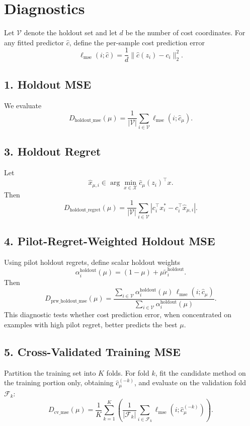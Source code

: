 \documentclass[11pt]{article}
\begin{document}
\section*{Diagnostics}
Let \(\mathcal{V}\) denote the holdout set and let \(d\) be the number of cost coordinates. For any fitted predictor \(\hat{c}\), define the per-sample cost prediction error
\[
\ell_{\mathrm{mse}}(i; \hat{c}) = \frac{1}{d}\|\hat{c}(z_i) - c_i\|_2^2.
\]

\subsection*{1. Holdout MSE}
We evaluate
\[
D_{\mathrm{holdout\_mse}}(\mu)
=
\frac{1}{|\mathcal{V}|}\sum_{i \in \mathcal{V}} \ell_{\mathrm{mse}}(i; \hat{c}_{\mu}).
\]

\subsection*{3. Holdout Regret}
Let
\[
\hat{x}_{\mu,i} \in \arg\min_{x \in \mathcal{X}} \hat{c}_{\mu}(z_i)^\top x.
\]
Then
\[
D_{\mathrm{holdout\_regret}}(\mu)
=
\frac{1}{|\mathcal{V}|}\sum_{i \in \mathcal{V}}
\left|c_i^\top x_i^* - c_i^\top \hat{x}_{\mu,i}\right|.
\]

\subsection*{4. Pilot-Regret-Weighted Holdout MSE}
Using pilot holdout regrets, define scalar holdout weights
\[
\alpha_i^{\mathrm{holdout}}(\mu) = (1-\mu) + \mu \widetilde{r}_i^{\mathrm{holdout}}.
\]
Then
\[
D_{\mathrm{prw\_holdout\_mse}}(\mu)
=
\frac{\sum_{i \in \mathcal{V}} \alpha_i^{\mathrm{holdout}}(\mu)\,\ell_{\mathrm{mse}}(i; \hat{c}_{\mu})}
{\sum_{i \in \mathcal{V}} \alpha_i^{\mathrm{holdout}}(\mu)}.
\]
This diagnostic tests whether cost prediction error, when concentrated on examples with high pilot regret, better predicts the best \(\mu\).

\subsection*{5. Cross-Validated Training MSE}
Partition the training set into \(K\) folds. For fold \(k\), fit the candidate method on the training portion only, obtaining \(\hat{c}_{\mu}^{(-k)}\), and evaluate on the validation fold \(\mathcal{F}_k\):
\[
D_{\mathrm{cv\_mse}}(\mu)
=
\frac{1}{K}\sum_{k=1}^K
\left(
\frac{1}{|\mathcal{F}_k|}\sum_{i \in \mathcal{F}_k} \ell_{\mathrm{mse}}(i; \hat{c}_{\mu}^{(-k)})
\right).
\]
\end{document}

